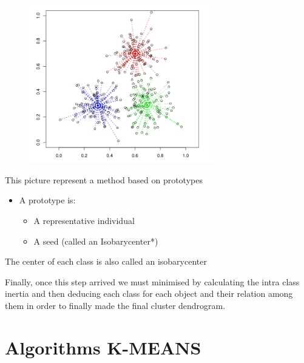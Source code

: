 \documentclass[12pt]{report}
\begin{document}
\begin{multicols}{2}



\begin{figure}[H]
\advance\leftskip -0.36in		\includegraphics[width=3.16in,height=2.71in]{./media/image18.png}
\end{figure}


This picture represent a method based on prototypes
\begin{itemize}
\item A prototype is:
\begin{itemize}
  \item A representative individual 
  \item A seed (called an Isobarycenter*)
\end{itemize}\end{itemize}
The center of each class is also called an isobarycenter
\par Finally, once this step arrived we must minimised by calculating the intra class inertia and then deducing each class for each object and their relation among them in order to finally made the final cluster dendrogram.


\end{multicols}

\newpage

\vspace{\baselineskip}\section*{Algorithms K-MEANS}
\end{document}
